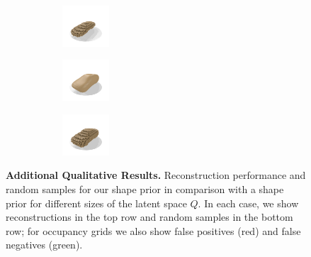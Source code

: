 \begin{figure}
\begin{subfigure}[t]{0.9\textwidth}
        \begin{subfigure}[t]{0.115\textwidth}
            \includegraphics[width=1.75cm,trim={0.25cm 0.25cm 1.25cm 1.25cm},clip]{gfx/appendix_experiments_prior/ppca_occ+sdf/sb.clean.10.large/binvox_random/00002}
        \end{subfigure}
        \begin{subfigure}[t]{0.115\textwidth}
            \includegraphics[width=1.75cm,trim={0.25cm 0.25cm 1.25cm 1.25cm},clip]{gfx/appendix_experiments_prior/ppca_occ+sdf/sb.clean.10.large/sdf_random/00004}
        \end{subfigure}
        \begin{subfigure}[t]{0.115\textwidth}
            \includegraphics[width=1.75cm,trim={0.25cm 0.25cm 1.25cm 1.25cm},clip]{gfx/appendix_experiments_prior/ppca_occ+sdf/sb.clean.10.large/binvox_random/00004}
        \end{subfigure}
    \end{subfigure}
    \caption{{\bf Additional Qualitative Results.} Reconstruction performance and random samples for our \VAE shape prior in comparison with a \PPCA shape prior for different sizes of the latent space $Q$. In each case, we show reconstructions in the top row and random samples in the bottom row; for occupancy grids we also show false positives ({\color{rred}red}) and false negatives ({\color{rgreen}green}).}
    \label{fig:appendix-experiments-prior}
\end{figure}
